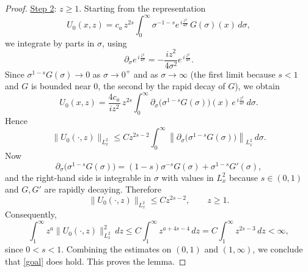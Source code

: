 \documentclass[10pt,a4paper]{amsart}
\begin{document}
\begin{proof}
\medskip
\noindent \underline{Step 2}: $z\ge 1$.
Starting from the representation
\[
U_0(x,z)
=
c_a\,z^{2s}\int_0^\infty \sigma^{-1-s}
e^{\,i\frac{z^2}{4\sigma}}\,G(\sigma)(x)\,d\sigma,
\]
we integrate by parts in $\sigma$, using
\[
\partial_\sigma e^{\,i\frac{z^2}{4\sigma}}
=
-\frac{i z^2}{4\sigma^2}e^{\,i\frac{z^2}{4\sigma}}.
\]
Since $\sigma^{1-s}G(\sigma)\to 0$ as $\sigma\to 0^+$ and as $\sigma\to\infty$
(the first limit because $s<1$ and $G$ is bounded near $0$, the second by the
rapid decay of $G$), we obtain
\[
U_0(x,z)
=
\frac{4c_a}{iz^2}\,z^{2s}
\int_0^\infty
\partial_\sigma\!\bigl(\sigma^{1-s}G(\sigma)\bigr)(x)\,
e^{\,i\frac{z^2}{4\sigma}}\,d\sigma.
\]
Hence
\[
\|U_0(\cdot,z)\|_{L^2_x}
\le
C z^{2s-2}
\int_0^\infty
\left\|\partial_\sigma\!\bigl(\sigma^{1-s}G(\sigma)\bigr)\right\|_{L^2_x}\,d\sigma.
\]
Now
\[
\partial_\sigma\!\bigl(\sigma^{1-s}G(\sigma)\bigr)
=
(1-s)\sigma^{-s}G(\sigma)+\sigma^{1-s}G'(\sigma),
\]
and the right-hand side is integrable in $\sigma$ with values in $L^2_x$
because $s\in(0,1)$ and $G,G'$ are rapidly decaying. Therefore
\[
\|U_0(\cdot,z)\|_{L^2_x}\le C z^{2s-2},
\qquad z\ge 1.
\]
Consequently,
\[
\int_1^\infty z^a\|U_0(\cdot,z)\|_{L^2_x}^2\,dz
\le
C\int_1^\infty z^{a+4s-4}\,dz
=
C\int_1^\infty z^{2s-3}\,dz<\infty,
\]
since $0<s<1$.
Combining the estimates on $(0,1)$ and $(1,\infty)$, we conclude that \eqref{goal} does hold. This proves the lemma.

\end{proof}
\end{document}
